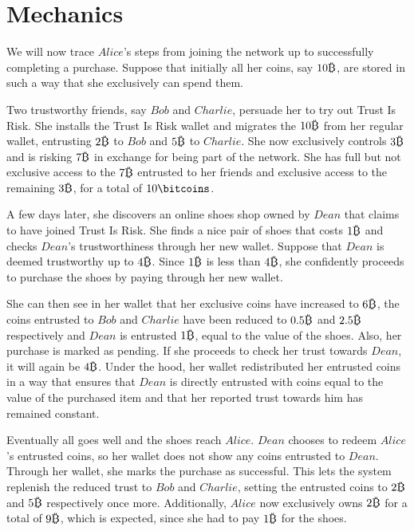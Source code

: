 \section{Mechanics}
  We will now trace $Alice$'s steps from joining the network up to successfully completing a purchase. Suppose that initially
  all her coins, say $10\bitcoin$, are stored in such a way that she exclusively can spend them.

  Two trustworthy friends, say $Bob$ and $Charlie$, persuade her to try out Trust Is Risk. She installs the Trust Is Risk
  wallet and migrates the $10\bitcoin$ from her regular wallet, entrusting $2\bitcoin$ to $Bob$ and $5\bitcoin$ to $Charlie$.
  She now exclusively controls $3\bitcoin$ and is risking $7\bitcoin$ in exchange for being part of the network. She has full
  but not exclusive access to the $7\bitcoin$ entrusted to her friends and exclusive access to the remaining $3\bitcoin$, for
  a total of $10\bitcoins$.

  A few days later, she discovers an online shoes shop owned by $Dean$ that claims to have joined Trust Is Risk. She finds a
  nice pair of shoes that costs $1\bitcoin$ and checks $Dean$'s trustworthiness through her new wallet. Suppose that $Dean$
  is deemed trustworthy up to $4\bitcoin$. Since $1\bitcoin$ is less than $4\bitcoin$, she confidently proceeds to purchase
  the shoes by paying through her new wallet.

  She can then see in her wallet that her exclusive coins have increased to $6\bitcoin$, the coins entrusted to $Bob$ and
  $Charlie$ have been reduced to $0.5\bitcoin$ and $2.5\bitcoin$ respectively and $Dean$ is entrusted $1\bitcoin$, equal to
  the value of the shoes. Also, her purchase is marked as pending. If she proceeds to check her trust towards $Dean$, it will
  again be $4\bitcoin$. Under the hood, her wallet redistributed her entrusted coins in a way that ensures that $Dean$ is
  directly entrusted with coins equal to the value of the purchased item and that her reported trust towards him has remained
  constant.

  Eventually all goes well and the shoes reach $Alice$. $Dean$ chooses to redeem $Alice$'s entrusted coins, so her wallet
  does not show any coins entrusted to $Dean$. Through her wallet, she marks the purchase as successful. This lets the system
  replenish the reduced trust to $Bob$ and $Charlie$, setting the entrusted coins to $2\bitcoin$ and $5\bitcoin$ respectively
  once more. Additionally, $Alice$ now exclusively owns $2\bitcoin$ for a total of $9\bitcoin$, which is expected, since she
  had to pay $1\bitcoin$ for the shoes.
